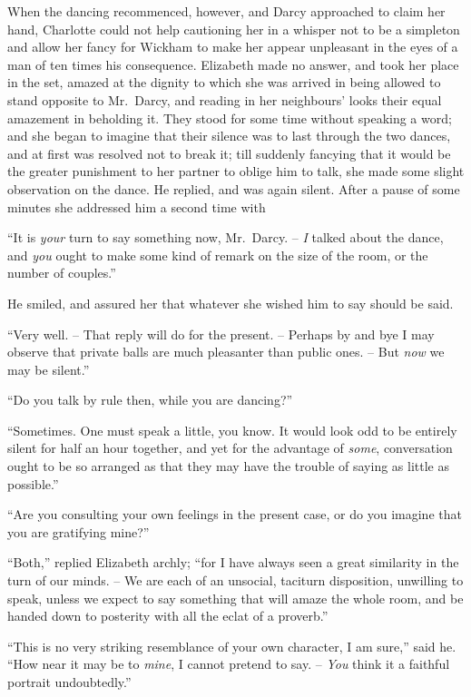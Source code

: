 When the dancing recommenced, however, and Darcy
approached to claim her hand, Charlotte could not help
cautioning her in a whisper not to be a simpleton and
allow her fancy for Wickham to make her appear unpleasant
in the eyes of a man of ten times his consequence.
Elizabeth made no answer, and took her place in the set,
amazed at the dignity to which she was arrived in being
allowed to stand opposite to Mr.\ Darcy, and reading in her
neighbours’ looks their equal amazement in beholding it.
They stood for some time without speaking a word; and
she began to imagine that their silence was to last through
the two dances, and at first was resolved not to break it;
till suddenly fancying that it would be the greater punishment
to her partner to oblige him to talk, she made some
slight observation on the dance. He replied, and was
again silent. After a pause of some minutes she addressed
him a second time with

“It is \textit{your} turn to say something now, Mr.\ Darcy. -- \textit{I}
talked about the dance, and \textit{you} ought to make some
kind of remark on the size of the room, or the number
of couples.”

He smiled, and assured her that whatever she wished
him to say should be said.

“Very well. -- That reply will do for the present. -- Perhaps
by and bye I may observe that private balls are
much pleasanter than public ones. -- But \textit{now} we may be
silent.”

“Do you talk by rule then, while you are dancing?”

“Sometimes. One must speak a little, you know. It
would look odd to be entirely silent for half an hour
together, and yet for the advantage of \textit{some}, conversation
ought to be so arranged as that they may have the trouble
of saying as little as possible.”

“Are you consulting your own feelings in the present
case, or do you imagine that you are gratifying mine?”

“Both,” replied Elizabeth archly; “for I have always
seen a great similarity in the turn of our minds. -- We are
each of an unsocial, taciturn disposition, unwilling to
speak, unless we expect to say something that will amaze
the whole room, and be handed down to posterity with
all the eclat of a proverb.”

“This is no very striking resemblance of your own
character, I am sure,” said he. “How near it may be
to \textit{mine}, I cannot pretend to say. -- \textit{You} think it a faithful
portrait undoubtedly.”

